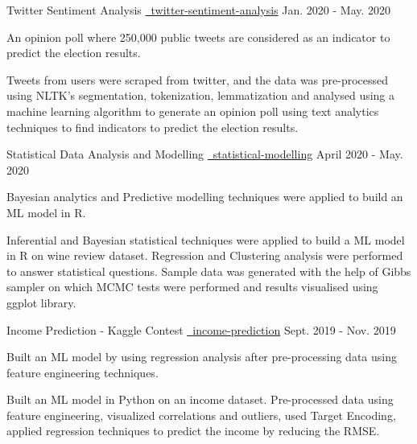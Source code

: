 \begin{cventries}
{\begin{cvitems}
{      }
      \end{cvitems}
    }
  \cvproject
    {Twitter Sentiment Analysis}
    {
    {}
    {\href{https://github.com/mukeshmk/twitter-sentiment-analysis}{\faGithubSquare\ twitter-sentiment-analysis}}
    }
    {Jan. 2020 - May. 2020}
    {
      \begin{cvitems}
      \vspace{-0.5ex}
      {
      \item {An opinion poll where 250,000 public tweets are considered as an indicator to predict the election results.}
      }
      {
      Tweets from users were scraped from twitter, and the data was pre-processed using NLTK's segmentation, tokenization, lemmatization and analysed using a machine learning algorithm to generate an opinion poll using text analytics techniques to find indicators to predict the election results.
      }
      \end{cvitems}
    }
  \cvproject
    {Statistical Data Analysis and Modelling}
    {
    {}
    {\href{https://github.com/mukeshmk/statistical-modelling}{\faGithubSquare\ statistical-modelling}}
    }
    {April 2020 - May. 2020}
    {
      \begin{cvitems}
      \vspace{-0.5ex}
      {
      \item {}Bayesian analytics and Predictive modelling techniques were applied to build an ML model in R.}
      {
      Inferential and Bayesian statistical techniques were applied to build a ML model in R on wine review dataset. Regression and Clustering analysis were performed to answer statistical questions. Sample data was generated with the help of Gibbs sampler on which MCMC tests were performed and results visualised using ggplot library.
      }
      \end{cvitems}
    }
  \cvproject
    {Income Prediction - Kaggle Contest}
    {
    {}
    {\href{https://github.com/mukeshmk/tcdml1920-income-ind}{\faGithubSquare\ income-prediction}}
    }
    {Sept. 2019 - Nov. 2019}
    {
      \begin{cvitems}
      \vspace{-0.5ex}
      {
      \item {Built an ML model by using regression analysis after pre-processing data using feature engineering techniques.}
      }
      {
      Built an ML model in Python on an income dataset. Pre-processed data using feature engineering, visualized correlations and outliers, used Target Encoding, applied regression techniques to predict the income by reducing the RMSE.
      }
      \end{cvitems}
    }


\end{cventries}
